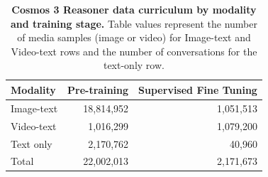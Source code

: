 \begin{table}[h]
\centering
\renewcommand{\arraystretch}{1.5}
\caption{\textbf{Cosmos 3 Reasoner data curriculum by modality and training stage.} Table values represent the number of media samples (image or video) for Image-text and Video-text rows and the number of conversations for the text-only row.}
\label{tab:data_reas_summary}
\setlength{\tabcolsep}{7pt}
\small
\begin{tabular}{lrr}
\toprule
\textbf{Modality}
    & \textbf{Pre-training}
    & \textbf{Supervised Fine Tuning } \\
\midrule
Image-text      & 18,814,952 & 1,051,513 \\
Video-text      & 1,016,299 & 1,079,200 \\
Text only       & 2,170,762 & 40,960 \\
Total           & 22,002,013 & 2,171,673 \\
\bottomrule
\end{tabular}
\end{table}